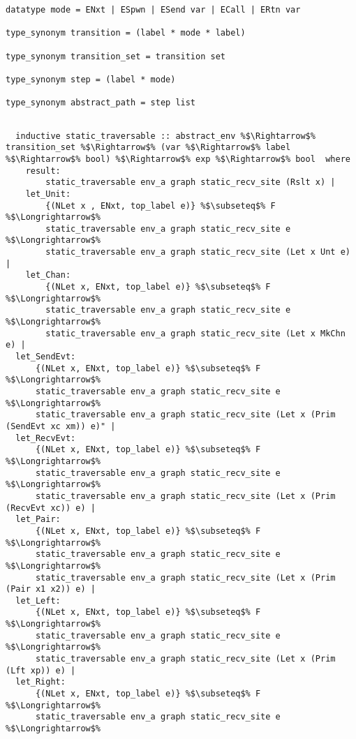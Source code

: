 \begin{lstlisting}[style=codestyle1, escapechar=\%]
datatype mode = ENxt | ESpwn | ESend var | ECall | ERtn var

type_synonym transition = (label * mode * label)

type_synonym transition_set = transition set

type_synonym step = (label * mode)

type_synonym abstract_path = step list
  \end{lstlisting}

\begin{lstlisting}[style=codestyle1, escapechar=\%]

  inductive static_traversable :: abstract_env %$\Rightarrow$% transition_set %$\Rightarrow$% (var %$\Rightarrow$% label %$\Rightarrow$% bool) %$\Rightarrow$% exp %$\Rightarrow$% bool  where
    result:
        static_traversable env_a graph static_recv_site (Rslt x) |
    let_Unit:
        {(NLet x , ENxt, top_label e)} %$\subseteq$% F %$\Longrightarrow$%
        static_traversable env_a graph static_recv_site e %$\Longrightarrow$%
        static_traversable env_a graph static_recv_site (Let x Unt e) |
    let_Chan:
        {(NLet x, ENxt, top_label e)} %$\subseteq$% F %$\Longrightarrow$%
        static_traversable env_a graph static_recv_site e %$\Longrightarrow$%
        static_traversable env_a graph static_recv_site (Let x MkChn e) |
  let_SendEvt:
      {(NLet x, ENxt, top_label e)} %$\subseteq$% F %$\Longrightarrow$%
      static_traversable env_a graph static_recv_site e %$\Longrightarrow$%
      static_traversable env_a graph static_recv_site (Let x (Prim (SendEvt xc xm)) e)" |
  let_RecvEvt:
      {(NLet x, ENxt, top_label e)} %$\subseteq$% F %$\Longrightarrow$%
      static_traversable env_a graph static_recv_site e %$\Longrightarrow$%
      static_traversable env_a graph static_recv_site (Let x (Prim (RecvEvt xc)) e) |
  let_Pair:
      {(NLet x, ENxt, top_label e)} %$\subseteq$% F %$\Longrightarrow$%
      static_traversable env_a graph static_recv_site e %$\Longrightarrow$%
      static_traversable env_a graph static_recv_site (Let x (Prim (Pair x1 x2)) e) |
  let_Left:
      {(NLet x, ENxt, top_label e)} %$\subseteq$% F %$\Longrightarrow$%
      static_traversable env_a graph static_recv_site e %$\Longrightarrow$%
      static_traversable env_a graph static_recv_site (Let x (Prim (Lft xp)) e) |
  let_Right:
      {(NLet x, ENxt, top_label e)} %$\subseteq$% F %$\Longrightarrow$%
      static_traversable env_a graph static_recv_site e %$\Longrightarrow$%

\end{lstlisting}
